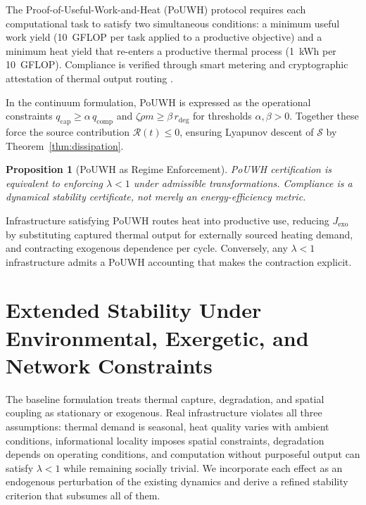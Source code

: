 \documentclass[10pt,twocolumn]{article}
\theoremstyle{plain}
\newtheorem{proposition}[theorem]{Proposition}
\theoremstyle{definition}
\theoremstyle{remark}
\begin{document}
The Proof-of-Useful-Work-and-Heat (PoUWH) protocol requires each
computational task to satisfy two simultaneous conditions: a minimum
useful work yield (10~GFLOP per task applied to a productive objective)
and a minimum heat yield that re-enters a productive thermal process
(1~kWh per 10~GFLOP). Compliance is verified through smart metering
and cryptographic attestation of thermal output routing \citep{eu2023}.

In the continuum formulation, PoUWH is expressed as the operational
constraints $q_{\mathrm{cap}} \geq \alpha\, q_{\mathrm{comp}}$ and
$\zeta\rho m \geq \beta\, r_{\mathrm{deg}}$ for thresholds
$\alpha, \beta > 0$. Together these force the source contribution
$\mathcal{R}(t) \leq 0$, ensuring Lyapunov descent of $\mathcal{S}$
by Theorem~\ref{thm:dissipation}.

\begin{proposition}[PoUWH as Regime Enforcement]
PoUWH certification is equivalent to enforcing $\lambda < 1$ under
admissible transformations. Compliance is a dynamical stability
certificate, not merely an energy-efficiency metric.
\end{proposition}

Infrastructure satisfying PoUWH routes heat into productive use,
reducing $J_{\mathrm{exo}}$ by substituting captured thermal output
for externally sourced heating demand, and contracting exogenous
dependence per cycle. Conversely, any $\lambda < 1$ infrastructure
admits a PoUWH accounting that makes the contraction explicit.

\section{Extended Stability Under Environmental, Exergetic, and Network Constraints}
\label{sec:extended}

The baseline formulation treats thermal capture, degradation, and
spatial coupling as stationary or exogenous. Real infrastructure
violates all three assumptions: thermal demand is seasonal, heat
quality varies with ambient conditions, informational locality
imposes spatial constraints, degradation depends on operating
conditions, and computation without purposeful output can satisfy
$\lambda < 1$ while remaining socially trivial. We incorporate each
effect as an endogenous perturbation of the existing dynamics and
derive a refined stability criterion that subsumes all of them.
\end{document}

